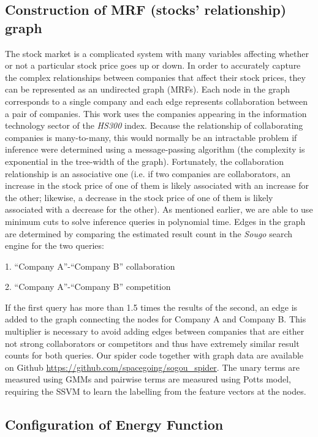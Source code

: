 \subsection{Construction of MRF (stocks' relationship) graph}
\label{sec:con_stock_graph}

The stock market is a complicated system with many variables
affecting whether or not a particular stock price goes up or
down. In order to accurately capture the complex relationships
between companies that affect their stock prices, they can be
represented as an undirected graph (MRFs). Each node in the graph
corresponds to a single company and each edge represents
collaboration between a pair of companies. This work uses the
companies appearing in the information technology sector of the
\emph{ HS300 } index. Because the relationship of collaborating
companies is many-to-many, this would normally be an intractable
problem if inference were determined using a message-passing
algorithm (the complexity is exponential in the tree-width of the
graph). Fortunately, the collaboration relationship is an
associative one (i.e. if two companies are collaborators, an
increase in the stock price of one of them is likely associated
with an increase for the other; likewise, a decrease in the stock
price of one of them is likely associated with a decrease for the
other). As mentioned earlier, we are able to use minimum cuts to
solve inference queries in polynomial time. Edges in the graph
are determined by comparing the estimated result count in the
\emph{ Sougo } search engine for the two queries:

1.  “Company A”-“Company B” collaboration

2.  “Company A”-“Company B” competition

If the first query has more than 1.5 times the results of the
second, an edge is added to the graph connecting the nodes for
Company A and Company B. This multiplier is necessary to avoid
adding edges between companies that are either not strong
collaborators or competitors and thus have extremely similar
result counts for both queries. Our spider code together with
graph data are available on Github
\url{https://github.com/spacegoing/sogou_spider}. The unary terms are
measured using GMMs and pairwise terms are measured using Potts
model, requiring the SSVM to learn the labelling from the feature
vectors at the nodes.

\subsection{Configuration of Energy Function}
\label{sec:grabcut}

